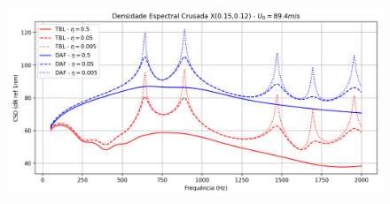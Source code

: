 \documentclass[9pt,a4paper,twoside]{rho-class/rho}
\begin{document}
\begin{figure}[H]
	\centering
	\includegraphics[width=0.9\columnwidth]{figures/csd_eta.png}
	\caption{}
	\label{fig:csdeta}
\end{figure}



\printbibliography

\end{document}
